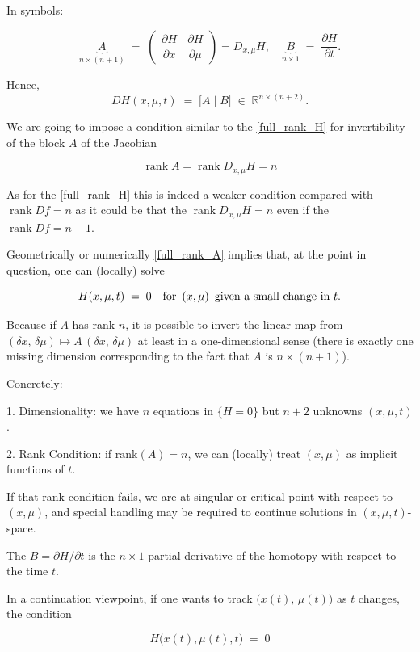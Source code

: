 \documentclass[11pt,american]{article}
\DeclareMathOperator{\rank}{\operatorname{rank}}
\theoremstyle{definition}
\theoremstyle{plain}
\theoremstyle{remark}
\begin{document}
In symbols:

\[
\underbrace{A}_{n\times(n+1)}
\;=\;
\begin{pmatrix}
\dfrac{\partial H}{\partial x} & \dfrac{\partial H}{\partial \mu}
\end{pmatrix} = D_{x,\mu} H,
\quad
\underbrace{B}_{n\times1}
\;=\;
\dfrac{\partial H}{\partial t}.
\]

Hence,
\[
DH(x,\mu,t) 
\;=\;
\bigl[A \;\big|\; B\bigr]
\;\in\;\mathbb{R}^{n\times(n+2)}.
\]

We are going to impose a condition similar to the \eqref{full_rank_H} for invertibility of the block $A$ of the Jacobian

\begin{equation}\label{full_rank_A}
\rank A = \rank D_{x,\mu} H = n
\end{equation}

As for the \eqref{full_rank_H} this is indeed a weaker condition compared with $\rank D f = n$ as it could be that the $\rank D_{x,\mu} H = n$ even if the $\rank D f = n - 1$.

Geometrically or numerically \eqref{full_rank_A} implies that, at the point in question, one can (locally) solve

\[
H(x,\mu,t)\;=\;0
\quad\text{for $\,(x,\mu)$\, given a small change in $t$.}
\]

Because if $A$ has rank $n$, it is possible to invert the linear map from $(\delta x,\,\delta\mu)\mapsto A\,(\delta x,\,\delta\mu)$ at least in a one-dimensional sense (there is exactly one missing dimension corresponding to the fact that $A$ is $n\times(n+1)$). 

Concretely:

1. Dimensionality: we have $n$ equations in $\{H=0\}$ but $n+2$ unknowns $(x,\mu,t)$.
  
2. Rank Condition: if $\mathrm{rank}(A)=n$, we can (locally) treat $(x,\mu)$ as implicit functions of $t$.  

If that rank condition fails, we are at singular or critical point with respect to $(x,\mu)$, and special handling may be required to continue solutions in $(x,\mu,t)$-space.

The $B = \partial H/\partial t$ is the $n\times1$ partial derivative of the homotopy with respect to the time $t$.

In a continuation viewpoint, if one wants to track $\bigl(x(t),\,\mu(t)\bigr)$ as $t$ changes, the condition

\[
H\bigl(x(t),\mu(t),t\bigr)\;=\;0
\]
\end{document}
